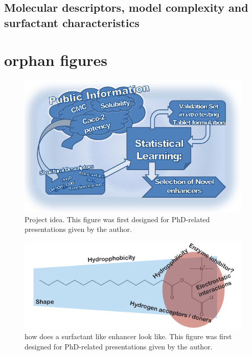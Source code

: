 \subsection{Molecular descriptors, model complexity and surfactant characteristics}
\label{modelMolecules}

\section{orphan figures}




\begin{figure}[!htbp]
\includegraphics{graphics/workSummary_130mm.pdf}
\caption{Project idea. This figure was first designed for PhD-related presentations given by the author.}
\label{workSummary}
\end{figure}

\begin{figure}[!htpb]
\includegraphics{graphics/typeOfSurfactant.pdf}
\caption{how does a surfactant like enhancer look like. This figure was first designed for PhD-related presentations given by the author.}
\label{typeOfSurfactant}
\end{figure}

